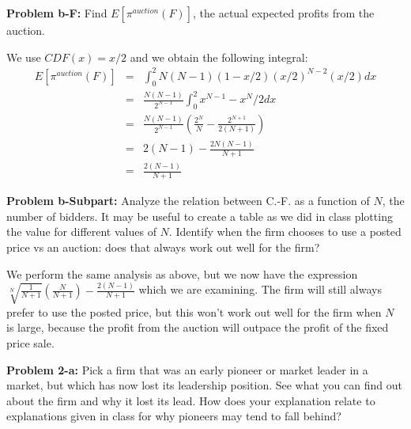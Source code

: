 \documentclass[psamsfonts]{amsart}
\newenvironment{sol}{\vspace{0.25cm}{\large \bfseries Solution:}}{\qedsymbol}
\newenvironment{prob}[1]{\begin{framed}{\large \bfseries Problem #1:}}{\end{framed}}
\begin{document}
\begin{prob}{b-F}
Find $E[\pi^{auction}(F)]$, the actual expected profits from the auction.
\end{prob}
\begin{sol}
We use $CDF(x) = x/2$ and we obtain the following integral:
\begin{eqnarray}
E[\pi^{auction}(F)] &=& \int_0^2 N(N-1) (1 - x/2)(x/2)^{N-2} (x/2) dx \\
&=& \frac{N(N-1)}{2^{N-1}} \int_0^2 x^{N-1} - x^{N}/2 dx \\
&=& \frac{N(N-1)}{2^{N-1}} \left( \frac{2^N}{N} - \frac{2^{N+1}}{2(N+1)} \right) \\
&=& 2(N-1) - \frac{2N(N-1)}{N+1} \\
&=& \frac{2(N-1)}{N+1}
\end{eqnarray}
\end{sol}

\begin{prob}{b-Subpart}
Analyze the relation between C.-F. as a function of $N$, the number of bidders. It may be useful to create a table as we did in class plotting the value for different values of $N$. Identify when the firm chooses to use a posted price vs an auction: does that always work out well for the firm?
\end{prob}

\begin{sol}
We perform the same analysis as above, but we now have the expression $\sqrt[N]{\frac{1}{N+1}} \left( \frac{N}{N+1} \right) - \frac{2(N-1)}{N+1}$ which we are examining. The firm will still always prefer to use the posted price, but this won't work out well for the firm when $N$ is large, because the profit from the auction will outpace the profit of the fixed price sale.
\end{sol}

\newpage

\begin{prob}{2-a}
Pick a firm that was an early pioneer or market leader in a market, but which has now lost its leadership position. See what you can find out about the firm and why it lost its lead. How does your explanation relate to explanations given in class for why pioneers may tend to fall behind?
\end{prob}
\end{document}

